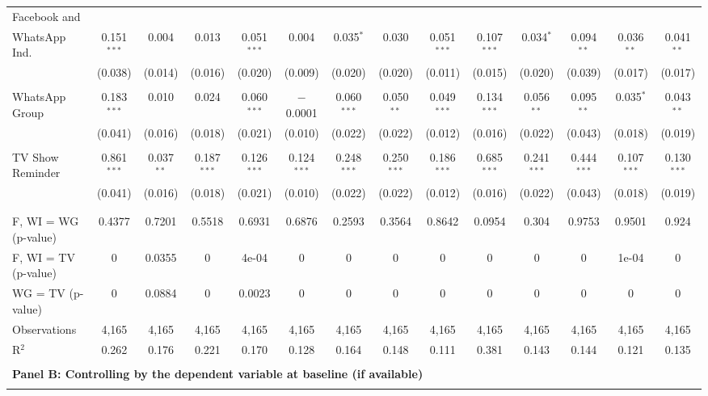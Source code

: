 \documentclass[12pt]{article}
\begin{document}
\begin{table}
\begin{tabular}{@{\extracolsep{0pt}}lccccccccccccc}
 Facebook and \\ WhatsApp Ind. & 0.151$^{***}$ & 0.004 & 0.013 & 0.051$^{***}$ & 0.004 & 0.035$^{*}$ & 0.030 & 0.051$^{***}$ & 0.107$^{***}$ & 0.034$^{*}$ & 0.094$^{**}$ & 0.036$^{**}$ & 0.041$^{**}$ \\ 
  & (0.038) & (0.014) & (0.016) & (0.020) & (0.009) & (0.020) & (0.020) & (0.011) & (0.015) & (0.020) & (0.039) & (0.017) & (0.017) \\ 
  & & & & & & & & & & & & & \\ 
 WhatsApp Group & 0.183$^{***}$ & 0.010 & 0.024 & 0.060$^{***}$ & $-$0.0001 & 0.060$^{***}$ & 0.050$^{**}$ & 0.049$^{***}$ & 0.134$^{***}$ & 0.056$^{**}$ & 0.095$^{**}$ & 0.035$^{*}$ & 0.043$^{**}$ \\ 
  & (0.041) & (0.016) & (0.018) & (0.021) & (0.010) & (0.022) & (0.022) & (0.012) & (0.016) & (0.022) & (0.043) & (0.018) & (0.019) \\ 
  & & & & & & & & & & & & & \\ 
 TV Show Reminder & 0.861$^{***}$ & 0.037$^{**}$ & 0.187$^{***}$ & 0.126$^{***}$ & 0.124$^{***}$ & 0.248$^{***}$ & 0.250$^{***}$ & 0.186$^{***}$ & 0.685$^{***}$ & 0.241$^{***}$ & 0.444$^{***}$ & 0.107$^{***}$ & 0.130$^{***}$ \\ 
  & (0.041) & (0.016) & (0.018) & (0.021) & (0.010) & (0.022) & (0.022) & (0.012) & (0.016) & (0.022) & (0.043) & (0.018) & (0.019) \\ 
  & & & & & & & & & & & & & \\ 
\hline \\[-1.8ex] 
F, WI = WG (p-value) & 0.4377 & 0.7201 & 0.5518 & 0.6931 & 0.6876 & 0.2593 & 0.3564 & 0.8642 & 0.0954 & 0.304 & 0.9753 & 0.9501 & 0.924 \\ 
F, WI = TV (p-value) & 0 & 0.0355 & 0 & 4e-04 & 0 & 0 & 0 & 0 & 0 & 0 & 0 & 1e-04 & 0 \\ 
WG = TV (p-value) & 0 & 0.0884 & 0 & 0.0023 & 0 & 0 & 0 & 0 & 0 & 0 & 0 & 0 & 0 \\ 
Observations & 4,165 & 4,165 & 4,165 & 4,165 & 4,165 & 4,165 & 4,165 & 4,165 & 4,165 & 4,165 & 4,165 & 4,165 & 4,165 \\ 
R$^{2}$ & 0.262 & 0.176 & 0.221 & 0.170 & 0.128 & 0.164 & 0.148 & 0.111 & 0.381 & 0.143 & 0.144 & 0.121 & 0.135 \\ 
\hline 
\\[-0.5ex] 
\multicolumn{13}{l}{\textbf{Panel B: Controlling by the dependent variable at baseline (if available)}} \\
\hline \\[-1ex]  

\end{tabular}
\end{table}
\end{document}
